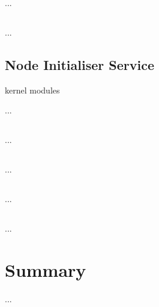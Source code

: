 ...

\subsection{}

...

\subsection{Node Initialiser Service}

kernel modules

...


\subsection{}

...

\subsection{}

...

\subsection{}

...

\subsection{}

...


\section{Summary}

...
